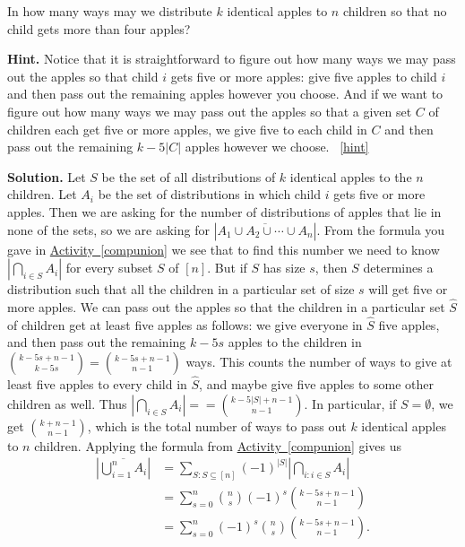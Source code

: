 \documentclass{book}
\begin{document}
\setcounter{project}{225}
\addtocounter{project}{-1}
\begin{activity}[]\label{act_restrictedmultisetspie}
\hypertarget{p-1246}{}%
In how many ways may we distribute \(k\) identical apples to \(n\) children so that no child gets more than four apples?%
\par\smallskip%
\noindent\textbf{Hint.}\hypertarget{hint-145}{}\quad%
\hypertarget{p-1247}{}%
Notice that it is straightforward to figure out how many ways we may pass out the apples so that child \(i\) gets five or more apples: give five apples to child \(i\) and then pass out the remaining apples however you choose. And if  we want to figure out how many ways we may pass out the apples so that a given set \(C\) of children each get five or more apples, we give five to each child in \(C\) and then pass out the remaining \(k-5|C|\) apples however we choose.%
~\hfill{\tiny\hyperlink{a-225}{[hint]}\hypertarget{q-225}{}}\par\smallskip%
\noindent\textbf{Solution.}\hypertarget{solution-146}{}\quad%
\hypertarget{p-1248}{}%
Let \(S\) be the set of all distributions of \(k\) identical apples to the \(n\) children. Let \(A_i\) be the set of distributions in which child \(i\) gets five or more apples. Then we are asking for the number of distributions of apples that lie in none of the sets, so we are asking for \(|\overline{A_1\cup A_2\cup \cdots \cup A_n}|\). From the formula you gave in \hyperref[compunion]{Activity~\ref{compunion}} we see that to find this number we need to know \(|\bigcap_{i\in S}A_i|\) for every subset \(S\) of \([n]\). But if \(S\) has size \(s\), then \(S\) determines a distribution such that all the children in a particular set of size \(s\) will get five or more apples. We can pass out the apples so that the children in a particular set \(\hat S\) of children get at least five apples as follows: we give everyone in \(\hat
S\) five apples, and then pass out the remaining \(k-5s\) apples to the children in \(\binom{k-5s+n-1}{k-5s}= \binom{k-5s+n-1}{n-1}\) ways. This counts the number of ways to give at least five apples to every child in \(\hat S\), and maybe give five apples to some other children as well. Thus \(|\bigcap_{i\in S}A_i| = = \binom{k-5|S|+n-1}{n-1}\). In particular, if \(S=\emptyset\), we get \(\binom{k+n-1}{n-1}\), which is the total number of ways to pass out \(k\) identical apples to \(n\) children. Applying the formula from \hyperref[compunion]{Activity~\ref{compunion}} gives us%
\begin{align*}
\left| \overline{\bigcup_{i=1}^n A_i}\right|&= \sum_{S:S\subseteq [n]}(-1)^{|S|}\left|\bigcap _{i\colon i\in S} A_i\right|\\
&= \sum_{s=0}^n \binom{n}{s}(-1)^s \binom{k-5s+n-1}{n-1}\\
&= \sum_{s=0}^n (-1)^s\binom{n}{s}\binom{k-5s+n-1}{n-1}\text{.}
\end{align*}
%
\end{activity}
\end{document}
